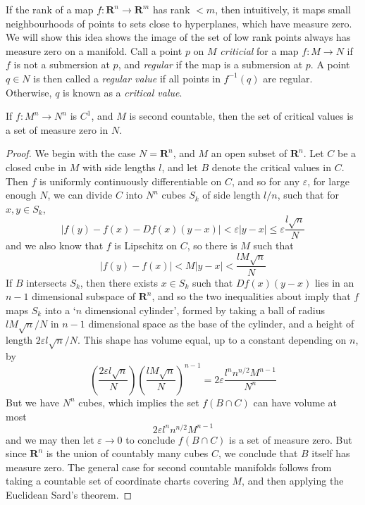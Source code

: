 If the rank of a map $f: \mathbf{R}^n \to \mathbf{R}^m$ has rank $< m$, then intuitively, it maps small neighbourhoods of points to sets close to hyperplanes, which have measure zero. We will show this idea shows the image of the set of low rank points always has measure zero on a manifold. Call a point $p$ on $M$ \emph{criticial} for a map $f:M \to N$ if $f$ is not a submersion at $p$, and \emph{regular} if the map is a submersion at $p$. A point $q \in N$ is then called a \emph{regular value} if all points in $f^{-1}(q)$ are regular. Otherwise, $q$ is known as a \emph{critical value}.

\begin{theorem}[Sard]
    If $f: M^n \to N^n$ is $C^1$, and $M$ is second countable, then the set of critical values is a set of measure zero in $N$.
\end{theorem}
\begin{proof}
    We begin with the case $N = \mathbf{R}^n$, and $M$ an open subset of $\mathbf{R}^n$. Let $C$ be a closed cube in $M$ with side lengths $l$, and let $B$ denote the critical values in $C$. Then $f$ is uniformly continuously differentiable on $C$, and so for any $\varepsilon$, for large enough $N$, we can divide $C$ into $N^n$ cubes $S_k$ of side length $l/n$, such that for $x,y \in S_k$,
    \[ |f(y) - f(x) - Df(x)(y - x)| < \varepsilon |y - x| \leq \varepsilon \frac{l \sqrt{n}}{N} \]
    and we also know that $f$ is Lipschitz on $C$, so there is $M$ such that
    \[ |f(y) - f(x)| < M|y - x| < \frac{lM \sqrt{n}}{N} \]
    If $B$ intersects $S_k$, then there exists $x \in S_k$ such that $Df(x)(y-x)$ lies in an $n-1$ dimensional subspace of $\mathbf{R}^n$, and so the two inequalities about imply that $f$ maps $S_k$ into a `$n$ dimensional cylinder', formed by taking a ball of radius $lM \sqrt{n}/N$ in $n-1$ dimensional space as the base of the cylinder, and a height of length $2 \varepsilon l\sqrt{n}/N$. This shape has volume equal, up to a constant depending on $n$, by
    \[ \left( \frac{2 \varepsilon l \sqrt{n}}{N} \right) \left( \frac{lM \sqrt{n}}{N} \right)^{n-1} = 2 \varepsilon \frac{l^n n^{n/2} M^{n-1}}{N^n} \]
    But we have $N^n$ cubes, which implies the set $f(B \cap C)$ can have volume at most
    \[ 2 \varepsilon l^n n^{n/2} M^{n-1} \]
    and we may then let $\varepsilon \to 0$ to conclude $f(B \cap C)$ is a set of measure zero. But since $\mathbf{R}^n$ is the union of countably many cubes $C$, we conclude that $B$ itself has measure zero. The general case for second countable manifolds follows from taking a countable set of coordinate charts covering $M$, and then applying the Euclidean Sard's theorem.
\end{proof}

